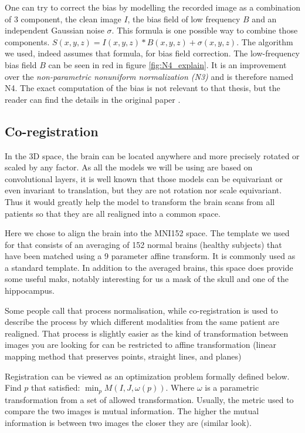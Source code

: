 One can try to correct the bias by modelling the recorded image as a combination of 3 component, the clean image $I$, the bias field of low frequency $B$ and an independent Gaussian noise $\sigma$. This formula is one possible way to combine those components. $S(x,y,z)= I(x,y,z)*B(x,y,z) +\sigma(x,y,z)$. The algorithm we used, indeed assumes that formula, for bias field correction. The low-frequency bias field $B$ can be seen in red in figure \ref{fig:N4_explain}. It is an improvement over the \textit{non-parametric nonuniform normalization (N3)} and is therefore named N4. 
The exact computation of the bias is not relevant to that thesis, but the reader can find the details in the original paper \cite{N4_paper}.


\subsection{Co-registration}
\label{sec:coregistration}

In the 3D space, the brain can be located anywhere and more precisely rotated or scaled by any factor. As all the models we will be using are based on convolutional layers, it is well known that those models can be equivariant or even invariant to translation, but they are not rotation nor scale equivariant. Thus it would greatly help the model to transform the brain scans from all patients so that they are all realigned into a common space. 

Here we chose to align the brain into the MNI152 space\footnotemark{}. The template we used for that consists of an averaging of 152 normal brains (healthy subjects) that have been matched using a 9 parameter affine transform. It is commonly used as a standard template. In addition to the averaged brains, this space does provide some useful maks, notably interesting for us a mask of the skull and one of the hippocampus.

Some people call that process normalisation, while co-registration is used to describe the process by which different modalities from the same patient are realigned. That process is slightly easier as the kind of transformation between images you are looking for can be restricted to affine transformation (linear mapping method that preserves points, straight lines, and planes)

Registration can be viewed as an optimization problem formally defined below.
Find $p$ that satisfied:  $\displaystyle  \min_{p} M(I,J, \omega(p))$. Where $\omega$ is a parametric transformation from a set of allowed transformation. Usually, the metric used to compare the two images is mutual information. The higher the mutual information is between two images the closer they are (similar look).

